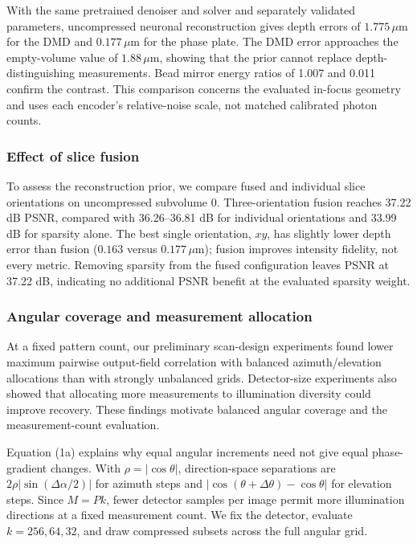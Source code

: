 With the same pretrained denoiser and solver and separately validated parameters, uncompressed neuronal reconstruction gives depth errors of \(1.775\,\mu\mathrm m\) for the DMD and \(0.177\,\mu\mathrm m\) for the phase plate. The DMD error approaches the empty-volume value of \(1.88\,\mu\mathrm m\), showing that the prior cannot replace depth-distinguishing measurements. Bead mirror energy ratios of 1.007 and 0.011 confirm the contrast. This comparison concerns the evaluated in-focus geometry and uses each encoder's relative-noise scale, not matched calibrated photon counts.

\subsubsection{Effect of slice fusion}

To assess the reconstruction prior, we compare fused and individual slice orientations on uncompressed subvolume 0. Three-orientation fusion reaches 37.22 dB PSNR, compared with 36.26--36.81 dB for individual orientations and 33.99 dB for sparsity alone. The best single orientation, \(xy\), has slightly lower depth error than fusion (\(0.163\) versus \(0.177\,\mu\mathrm m\)); fusion improves intensity fidelity, not every metric. Removing sparsity from the fused configuration leaves PSNR at 37.22 dB, indicating no additional PSNR benefit at the evaluated sparsity weight.

\subsubsection{Angular coverage and measurement allocation}

At a fixed pattern count, our preliminary scan-design experiments found lower maximum pairwise output-field correlation with balanced azimuth/elevation allocations than with strongly unbalanced grids. Detector-size experiments also showed that allocating more measurements to illumination diversity could improve recovery. These findings motivate balanced angular coverage and the measurement-count evaluation.

Equation (1a) explains why equal angular increments need not give equal phase-gradient changes. With \(\rho=|\cos\theta|\), direction-space separations are \(2\rho|\sin(\Delta\alpha/2)|\) for azimuth steps and \(|\cos(\theta+\Delta\theta)-\cos\theta|\) for elevation steps. Since \(M=Pk\), fewer detector samples per image permit more illumination directions at a fixed measurement count. We fix the detector, evaluate \(k=256,64,32\), and draw compressed subsets across the full angular grid.

